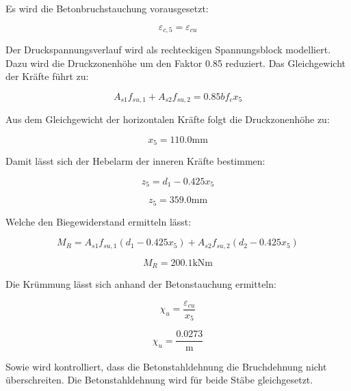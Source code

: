 \documentclass[
  12pt,
  letterpaper,
  egregdoesnotlikesansseriftitles]{scrreprt}
\begin{document}
Es wird die Betonbruchstauchung vorausgesetzt:

\begin{equation}\varepsilon_{c,5} = \varepsilon_{cu}\end{equation}

Der Druckspannungsverlauf wird als rechteckigen Spannungsblock
modelliert. Dazu wird die Druckzonenhöhe um den Faktor 0.85 reduziert.
Das Gleichgewicht der Kräfte führt zu:

\begin{equation}A_{s 1} f_{su,1} + A_{s 2} f_{su,2} = 0.85 b f_{c} x_{5}\end{equation}

Aus dem Gleichgewicht der horizontalen Kräfte folgt die Druckzonenhöhe
zu:

\begin{equation}x_{5} = 110.0 \text{mm}\end{equation}

Damit lässt sich der Hebelarm der inneren Kräfte bestimmen:

\begin{equation}z_{5} = d_{1} - 0.425 x_{5}\end{equation}

\begin{equation}z_{5} = 359.0 \text{mm}\end{equation}

Welche den Biegewiderstand ermitteln lässt:

\begin{equation}M_{R} = A_{s 1} f_{su,1} \left(d_{1} - 0.425 x_{5}\right) + A_{s 2} f_{su,2} \left(d_{2} - 0.425 x_{5}\right)\end{equation}

\begin{equation}M_{R} = 200.1 \text{kN} \text{m}\end{equation}

Die Krümmung lässt sich anhand der Betonstauchung ermitteln:

\begin{equation}\chi_{u} = \frac{\varepsilon_{cu}}{x_{5}}\end{equation}

\begin{equation}\chi_{u} = \frac{0.0273}{\text{m}}\end{equation}

Sowie wird kontrolliert, dass die Betonstahldehnung die Bruchdehnung
nicht überschreiten. Die Betonstahldehnung wird für beide Stäbe
gleichgesetzt.
\end{document}
